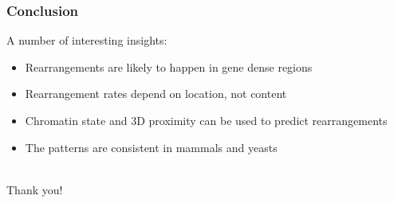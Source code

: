 \documentclass[svgnames,14pt]{beamer}
\begin{document}
\begin{frame}
\frametitle{Conclusion}
A number of interesting insights:
\begin{itemize}
\item Rearrangements are likely to happen in gene dense regions
\item Rearrangement rates depend on location, not content
\item Chromatin state and 3D proximity can be used to predict rearrangements
\item The patterns are consistent in mammals and yeasts
\end{itemize}
\vspace{12pt}

\end{frame}

\begin{frame}
\begin{center}
\hfill \huge \\
Thank you!
\end{center}
\end{frame}
\end{document}
